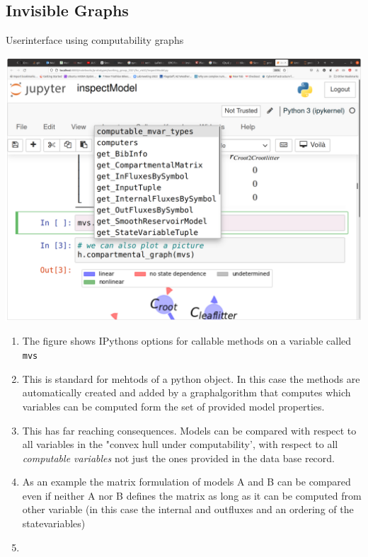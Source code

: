 \documentclass[96pt]{article}
\begin{document}
\begin{tcbposter}
{\begin{multicols*}{4}
\subsection{Invisible Graphs}
\begin{mybox}{Userinterface using computability graphs}
\end{mybox}
  \includegraphics[width=\columnwidth]{mvsTabScreenBig.png}
    \begin{enumerate}
    \item
    The figure shows IPythons options for callable methods on a variable called \texttt{mvs} 
    \item
    This is standard for mehtods of a python object. 
    In this case the methods are automatically created and added by a graphalgorithm that computes 
    which variables can be computed form the set of provided model properties.
    \item 
    This has far reaching consequences.
    Models can be compared with respect to all variables in the "convex hull under computability', 
    with respect to all \emph{computable variables} not just the ones provided in the data base record.
    \item
    As an example the matrix formulation of models A and B  can be compared even if neither A nor B defines
    the matrix as long as it can be computed from other variable (in this case the internal and outfluxes and an ordering of the statevariables)
    \item

\end{enumerate}
\end{multicols*}}
\end{tcbposter}
\end{document}

